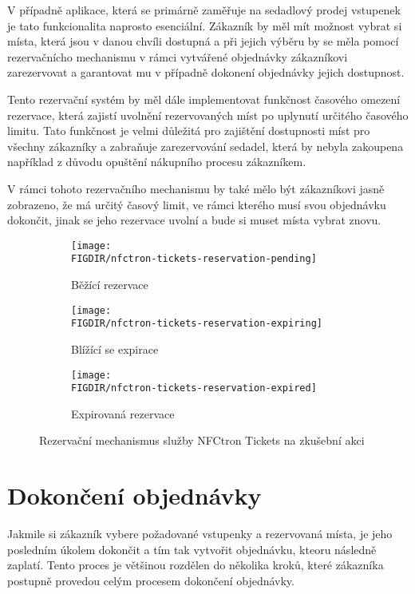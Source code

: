 V případně aplikace, která se primárně zaměřuje na sedadlový prodej vstupenek je tato funkcionalita naprosto esenciální. Zákazník by měl mít možnost vybrat si místa, která jsou v danou chvíli dostupná a při jejich výběru by se měla pomocí rezervačnícho mechanismu v rámci vytvářené objednávky zákazníkovi zarezervovat a garantovat mu v případně dokonení objednávky jejich dostupnost.

Tento rezervační systém by měl dále implementovat funkčnost časového omezení rezervace, která zajistí uvolnění rezervovaných míst po uplynutí určitého časového limitu. Tato funkčnost je velmi důležitá pro zajištění dostupnosti míst pro všechny zákazníky a zabraňuje zarezervování sedadel, která by nebyla zakoupena například z důvodu opuštění nákupního procesu zákazníkem.

V rámci tohoto rezervačního mechanismu by také mělo být zákazníkovi jasně zobrazeno, že má určitý časový limit, ve rámci kterého musí svou objednávku dokončit, jinak se jeho rezervace uvolní a bude si muset místa vybrat znovu.

\begin{figure}[H]
    \centering
    \begin{subfigure}{0.3\textwidth}
        \texttt{[image: \\FIGDIR/nfctron-tickets-reservation-pending]}
        \caption{Běžící rezervace}
        \label{fig:nfctron-tickets-reservation-pending}
    \end{subfigure}
    \hfill
    \begin{subfigure}{0.3\textwidth}
        \texttt{[image: \\FIGDIR/nfctron-tickets-reservation-expiring]}
        \caption{Blížící se expirace}
        \label{fig:nfctron-tickets-reservation-expiring}
    \end{subfigure}
    \hfill
    \begin{subfigure}{0.3\textwidth}
        \texttt{[image: \\FIGDIR/nfctron-tickets-reservation-expired]}
        \caption{Expirovaná rezervace}
        \label{fig:nfctron-tickets-reservation-expired}
    \end{subfigure}

    \caption{Rezervační mechanismus služby NFCtron Tickets na zkušební akci}
    \label{fig:nfctron-tickets-reservation}
\end{figure}

\section{Dokončení objednávky}
\label{sec:specifikace-dokonceni-objednavky}
Jakmile si zákazník vybere požadované vstupenky a rezervovaná místa, je jeho posledním úkolem dokončit a tím tak vytvořit objednávku, kteoru následně zaplatí.
Tento proces je většinou rozdělen do několika kroků, které zákazníka postupně provedou celým procesem dokončení objednávky.

